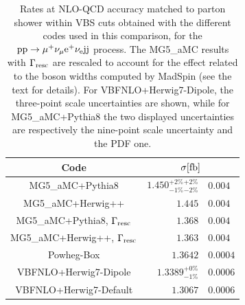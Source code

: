 \begin{table}[h!]
    \centering
    \begin{tabular}{c|r@{ $\pm$ }l}
      Code  &  \multicolumn{2}{c}{$\sigma[\rm{fb}]$}  \\
        \hline\hline
        {\sc MG5\_aMC}+{\sc Pythia8}&  $1.450 ^{+2\%}_{-1\%} {}^{+2\%}_{-2\%} $ & $0.004$  \\
        {\sc MG5\_aMC}+{\sc Herwig++}&  $1.445 $ & $0.004$  \\
        {\sc MG5\_aMC}+{\sc Pythia8}, $\Gamma_{\rm resc}$&  $1.368$ & $0.004$  \\
        {\sc MG5\_aMC}+{\sc Herwig++}, $\Gamma_{\rm resc}$&  $1.363$ & $0.004$  \\
        {\sc Powheg-Box}  & $1.3642$ & $0.0004$  \\
        {\sc VBFNLO}+{\sc Herwig7-Dipole} &  $1.3389 ^{+0\%}_{-1\%}$ & $0.0006$  \\
        {\sc VBFNLO}+{\sc Herwig7-Default} &  $1.3067$ & $0.0006$  \\
    \end{tabular}
    \caption{\label{tab:PSratesNLO} Rates at NLO-QCD  accuracy matched to parton shower within VBS cuts obtained with the different codes used in this comparison,
    for the ${\rm p}{\rm p}\to\mu^+\nu_\mu{\rm e}^+\nu_{\rm e}{\rm j}{\rm j}$ process. The {\sc MG5\_aMC} results with $\Gamma_{\rm resc}$ 
    are rescaled to account for the effect related to the boson widths computed by {\sc MadSpin} (see the text for details). For
    {\sc VBFNLO}+{\sc Herwig7-Dipole}, the three-point scale uncertainties are shown, while for  {\sc MG5\_aMC}+{\sc Pythia8} the two displayed uncertainties
are respectively the nine-point scale uncertainty and the PDF one.}
\end{table}

